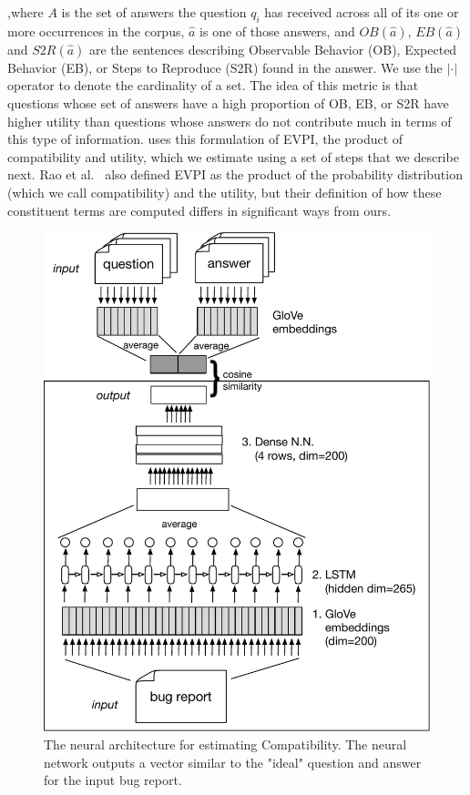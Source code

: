 \noindent
,where $A$ is the set of answers the question $q_{i}$ has received across all of its one or more occurrences in the
corpus, $\hat a$ is one of those answers, and $OB(\hat a)$, $EB(\hat a)$ and $S2R(\hat a)$ are the sentences describing Observable Behavior (OB), Expected Behavior (EB), or
Steps to Reproduce (S2R) found in the answer. We use the $|\cdot|$ operator to denote the cardinality of a set.
The idea of this metric is that questions whose set of answers have a high proportion
of OB, EB, or S2R have higher utility than questions whose answers do not contribute much in
terms of this type of information. \evpi uses this formulation of EVPI, the product of compatibility and utility, which we
estimate using a set of steps that we describe next. Rao et al.~\cite{rao-daume-iii-2018-learning} also defined EVPI as the product of the probability distribution (which we call compatibility) and the utility, but their definition of how these constituent terms are computed differs in significant ways from ours.

\begin{figure}[t]
\centering
\includegraphics[width=0.99\linewidth]{figures/compat_nn.pdf}
\caption{The neural architecture for estimating Compatibility. The neural network outputs a vector similar
to the "ideal" question and answer for the input bug report.}
\label{fig:compat_nn}
\end{figure}


